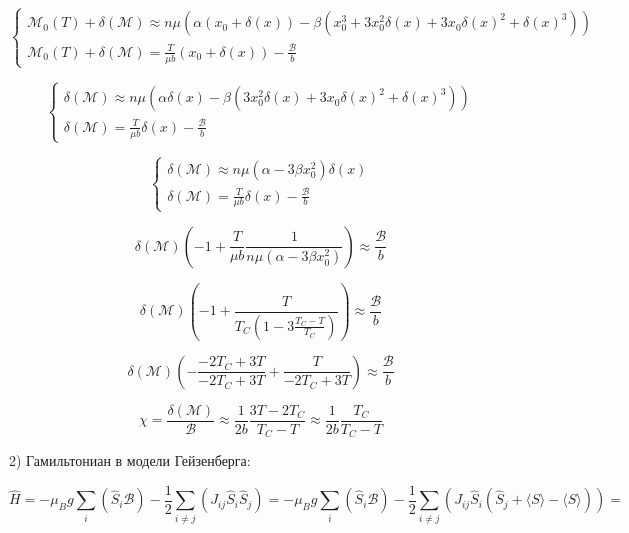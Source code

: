 \documentclass[a4paper,12pt]{article} %
\begin{document}
\begin{ttask}
\[ \left\{\begin{array}{l}
	\mathcal{M}_{0}(T)+\delta(\mathcal{M}) \approx n \mu\left(\alpha\left(x_{0}+\delta(x)\right)-\beta\left(x_{0}^{3}+3 x_{0}^{2} \delta(x)+3 x_{0} \delta(x)^{2}+\delta(x)^{3}\right)\right) \\
	\mathcal{M}_{0}(T)+\delta(\mathcal{M})=\frac{T}{\mu b}\left(x_{0}+\delta(x)\right)-\frac{\mathcal{B}}{b}
\end{array}\right. \]



$$
\left\{\begin{array}{l}
	\delta(\mathcal{M}) \approx n \mu\left(\alpha \delta(x)-\beta\left(3 x_{0}^{2} \delta(x)+3 x_{0} \delta(x)^{2}+\delta(x)^{3}\right)\right) \\
	\delta(\mathcal{M})=\frac{T}{\mu b} \delta(x)-\frac{\mathcal{B}}{b}
\end{array}\right.
$$


$$
\left\{\begin{array}{l}
	\delta(\mathcal{M}) \approx n \mu\left(\alpha-3 \beta x_{0}^{2}\right) \delta(x) \\
	\delta(\mathcal{M})=\frac{T}{\mu b} \delta(x)-\frac{\mathcal{B}}{b}
\end{array}\right.
$$





$$
\delta(\mathcal{M})\left(-1+\frac{T}{\mu b} \frac{1}{n \mu\left(\alpha-3 \beta x_{0}^{2}\right)}\right) \approx \frac{\mathcal{B}}{b}
$$



$$
\delta(\mathcal{M})\left(-1+\frac{T}{T_{C}\left(1-3 \frac{T_{C}-T}{T_{C}}\right)}\right) \approx \frac{\mathcal{B}}{b}
$$


$$
\delta(\mathcal{M})\left(-\frac{-2 T_{C}+3 T}{-2 T_{C}+3 T}+\frac{T}{-2 T_{C}+3 T}\right) \approx \frac{\mathcal{B}}{b}
$$

$$
\chi=\frac{\delta(\mathcal{M})}{\mathcal{B}} \approx \frac{1}{2 b} \frac{3 T-2 T_{C}}{T_{C}-T} \approx \frac{1}{2 b} \frac{T_{C}}{T_{C}-T}
$$






2) Гамильтониан в модели Гейзенберга:




\[ \hat{H}=-\mu_{B} g \sum_{i}\left(\hat{S}_{i} \mathcal{B}\right)-\frac{1}{2} \sum_{i \neq j}\left(J_{i j} \hat{S}_{i} \hat{S}_{j}\right)=-\mu_{B} g \sum_{i}\left(\hat{S}_{i} \mathcal{B}\right)-\frac{1}{2} \sum_{i \neq j}\left(J_{i j} \hat{S}_{i}\left(\hat{S}_{j}+\langle S\rangle-\langle S\rangle\right)\right)= \]




\end{ttask}
\end{document}
